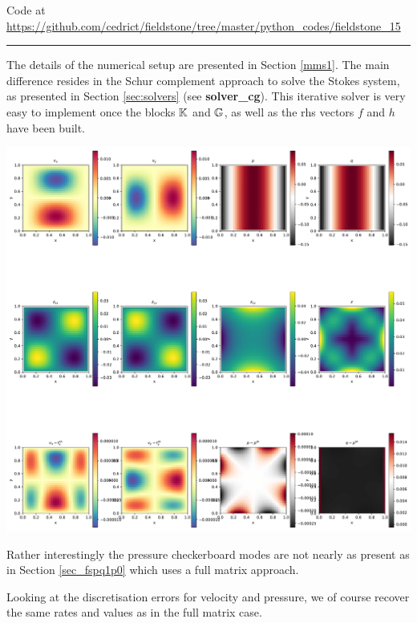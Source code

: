 

\begin{center}
Code at \url{https://github.com/cedrict/fieldstone/tree/master/python_codes/fieldstone_15}
\end{center}

\par\noindent\rule{\textwidth}{0.4pt}

The details of the numerical setup are presented in Section \ref{mms1}.
The main difference resides in the Schur complement approach to solve the 
Stokes system, as presented in Section \ref{sec:solvers} (see {\bf solver\_cg}).
This iterative solver is very easy to implement once the blocks ${\mathbb{K}}$ and ${\mathbb{G}}$, 
as well as the rhs vectors $f$ and $h$ have been built. 

\includegraphics[width=16cm]{python_codes/fieldstone_15/images/solution.pdf}

Rather interestingly the pressure checkerboard modes are not nearly as present as 
in Section \ref{sec_fspq1p0} which uses a full matrix approach. 

Looking at the discretisation errors for velocity and pressure, we 
of course recover the same rates and values as in the full matrix case.

